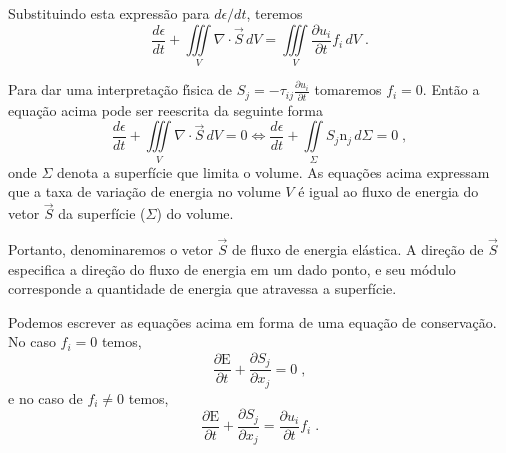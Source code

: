 Substituindo esta express\~ao para $d\epsilon/dt$, teremos
\begin{equation}
  \frac{d\epsilon}{dt}+\iiint\limits_{V} \nabla \cdot
  \vec{S}\,dV=
  \iiint\limits_{V}
\frac{\partial u_{i}}{\partial t}f_{i}\,dV \;.
\end{equation}

Para dar uma interpreta\c{c}\~ao f\'\i sica de
$S_{j}=-\tau_{ij}\frac{\partial u_{i}}{\partial t}$ tomaremos
$f_{i}=0$. Ent\~ao a equa\c{c}\~ao acima pode ser reescrita da
seguinte forma
\begin{equation}
  \frac{d\epsilon}{dt}+\iiint\limits_{V}\nabla \cdot
  \vec{S}\,dV=0\Leftrightarrow
\frac{d\epsilon}{dt}+\iint\limits_{\Sigma}
S_{j}\mbox{n}_{j}\,d\Sigma=0 \;,
\end{equation}
onde $\Sigma$ denota a superf\'icie que limita o volume. As equa\c{c}\~oes acima 
expressam que a taxa de varia\c{c}\~ao de energia no volume $V$ \'e igual ao
fluxo de energia do vetor $\vec{S}$ da superf\'icie ($\Sigma$) do volume. 

Portanto, denominaremos o vetor $\vec{S}$ de fluxo de energia el\'astica.
A dire\c{c}\~ao de $\vec{S}$ especifica a dire\c{c}\~ao do fluxo de energia em um
dado ponto, e seu m\'odulo corresponde a quantidade de energia que atravessa
a superf\'icie.

Podemos escrever as equa\c{c}\~oes acima em forma de uma
equa\c{c}\~ao de conserva\c{c}\~ao. No caso $f_{i}=0$ temos,
\begin{equation}
\frac{\partial \mbox{E}}{\partial t}+\frac{\partial S_{j}}{\partial x_{j}}=0 \;,
\end{equation}
e no caso de $f_{i} \neq 0$ temos,
\begin{equation}
\frac{\partial \mbox{E}}{\partial t}+\frac{\partial S_{j}}{\partial x_{j}}=
\frac{\partial u_{i}}{\partial t}f_{i} \;.
\end{equation}









%
%
%
